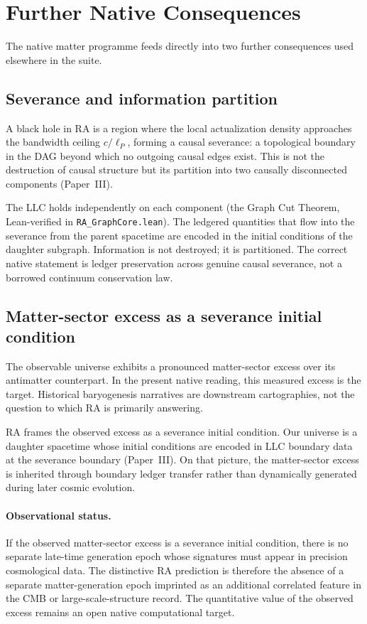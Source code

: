\documentclass[11pt]{article}
\begin{document}
\section{Further Native Consequences}
\label{sec:consequences}

The native matter programme feeds directly into two further consequences used elsewhere in the suite.

\subsection{Severance and information partition}

A black hole in RA is a region where the local actualization density approaches the bandwidth ceiling $c/\ell_P$, forming a causal severance: a topological boundary in the DAG beyond which no outgoing causal edges exist. This is not the destruction of causal structure but its partition into two causally disconnected components (Paper~III).

The LLC holds independently on each component (the Graph Cut Theorem, Lean-verified in \texttt{RA\_GraphCore.lean}). The ledgered quantities that flow into the severance from the parent spacetime are encoded in the initial conditions of the daughter subgraph. Information is not destroyed; it is partitioned. The correct native statement is ledger preservation across genuine causal severance, not a borrowed continuum conservation law.

\subsection{Matter-sector excess as a severance initial condition}

The observable universe exhibits a pronounced matter-sector excess over its antimatter counterpart. In the present native reading, this measured excess is the target. Historical baryogenesis narratives are downstream cartographies, not the question to which RA is primarily answering.

RA frames the observed excess as a severance initial condition. Our universe is a daughter spacetime whose initial conditions are encoded in LLC boundary data at the severance boundary (Paper~III). On that picture, the matter-sector excess is inherited through boundary ledger transfer rather than dynamically generated during later cosmic evolution.

\paragraph{Observational status.} If the observed matter-sector excess is a severance initial condition, there is no separate late-time generation epoch whose signatures must appear in precision cosmological data. The distinctive RA prediction is therefore the absence of a separate matter-generation epoch imprinted as an additional correlated feature in the CMB or large-scale-structure record. The quantitative value of the observed excess remains an open native computational target.
\end{document}
